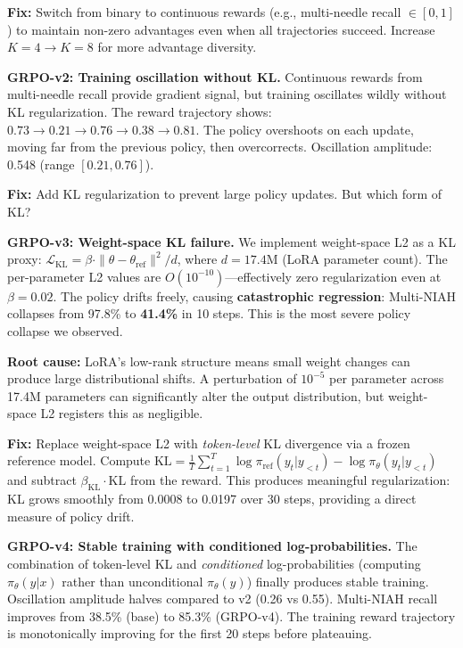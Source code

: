 \documentclass{article}
\begin{document}
\textbf{Fix:} Switch from binary to continuous rewards (e.g., multi-needle recall $\in [0, 1]$) to maintain non-zero advantages even when all trajectories succeed. Increase $K{=}4 \to K{=}8$ for more advantage diversity.

\textbf{GRPO-v2: Training oscillation without KL.} Continuous rewards from multi-needle recall provide gradient signal, but training oscillates wildly without KL regularization. The reward trajectory shows: $0.73 \to 0.21 \to 0.76 \to 0.38 \to 0.81$. The policy overshoots on each update, moving far from the previous policy, then overcorrects. Oscillation amplitude: 0.548 (range $[0.21, 0.76]$).

\textbf{Fix:} Add KL regularization to prevent large policy updates. But which form of KL?

\textbf{GRPO-v3: Weight-space KL failure.} We implement weight-space L2 as a KL proxy: $\mathcal{L}_\text{KL} = \beta \cdot \|\theta - \theta_{\text{ref}}\|^2 / d$, where $d = 17.4$M (LoRA parameter count). The per-parameter L2 values are $O(10^{-10})$---effectively zero regularization even at $\beta{=}0.02$. The policy drifts freely, causing \textbf{catastrophic regression}: Multi-NIAH collapses from 97.8\% to \textbf{41.4\%} in 10 steps. This is the most severe policy collapse we observed.

\textbf{Root cause:} LoRA's low-rank structure means small weight changes can produce large distributional shifts. A perturbation of $10^{-5}$ per parameter across 17.4M parameters can significantly alter the output distribution, but weight-space L2 registers this as negligible.

\textbf{Fix:} Replace weight-space L2 with \emph{token-level} KL divergence via a frozen reference model. Compute $\text{KL} = \frac{1}{T}\sum_{t=1}^T \log \pi_{\text{ref}}(y_t | y_{<t}) - \log \pi_\theta(y_t | y_{<t})$ and subtract $\beta_\text{KL} \cdot \text{KL}$ from the reward. This produces meaningful regularization: KL grows smoothly from 0.0008 to 0.0197 over 30 steps, providing a direct measure of policy drift.

\textbf{GRPO-v4: Stable training with conditioned log-probabilities.} The combination of token-level KL and \emph{conditioned} log-probabilities (computing $\pi_\theta(y | x)$ rather than unconditional $\pi_\theta(y)$) finally produces stable training. Oscillation amplitude halves compared to v2 (0.26 vs 0.55). Multi-NIAH recall improves from 38.5\% (base) to 85.3\% (GRPO-v4). The training reward trajectory is monotonically improving for the first 20 steps before plateauing.
\end{document}
